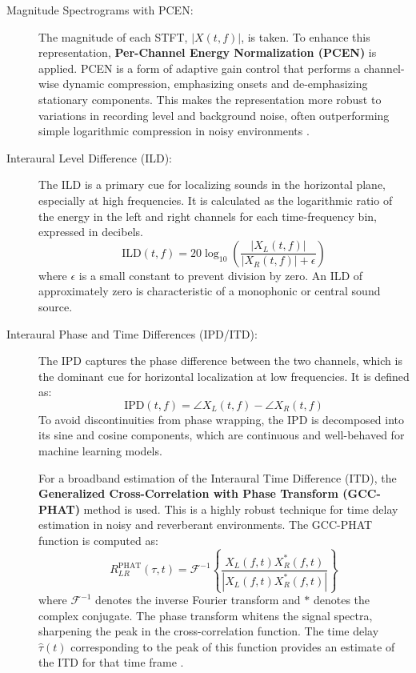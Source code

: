 \documentclass[12pt, a4paper]{article}
\begin{document}
\begin{description}
    \item[Magnitude Spectrograms with PCEN:] The magnitude of each STFT, $|X(t,f)|$, is taken. To enhance this representation, \textbf{Per-Channel Energy Normalization (PCEN)} is applied. PCEN is a form of adaptive gain control that performs a channel-wise dynamic compression, emphasizing onsets and de-emphasizing stationary components. This makes the representation more robust to variations in recording level and background noise, often outperforming simple logarithmic compression in noisy environments \cite{wang2017per}.
    
    \item[Interaural Level Difference (ILD):] The ILD is a primary cue for localizing sounds in the horizontal plane, especially at high frequencies. It is calculated as the logarithmic ratio of the energy in the left and right channels for each time-frequency bin, expressed in decibels.
    \begin{equation}
        \text{ILD}(t, f) = 20 \log_{10} \left( \frac{|X_L(t, f)|}{|X_R(t, f)| + \epsilon} \right)
    \end{equation}
    where $\epsilon$ is a small constant to prevent division by zero. An ILD of approximately zero is characteristic of a monophonic or central sound source.
    
    \item[Interaural Phase and Time Differences (IPD/ITD):] The IPD captures the phase difference between the two channels, which is the dominant cue for horizontal localization at low frequencies. It is defined as:
    \begin{equation}
        \text{IPD}(t, f) = \angle X_L(t, f) - \angle X_R(t, f)
    \end{equation}
    To avoid discontinuities from phase wrapping, the IPD is decomposed into its sine and cosine components, which are continuous and well-behaved for machine learning models.
    
    For a broadband estimation of the Interaural Time Difference (ITD), the \textbf{Generalized Cross-Correlation with Phase Transform (GCC-PHAT)} method is used. This is a highly robust technique for time delay estimation in noisy and reverberant environments. The GCC-PHAT function is computed as:
    \begin{equation}
        R_{LR}^{\text{PHAT}}(\tau, t) = \mathcal{F}^{-1} \left\{ \frac{X_L(f, t) X_R^*(f, t)}{|X_L(f, t) X_R^*(f, t)|} \right\}
    \end{equation}
    where $\mathcal{F}^{-1}$ denotes the inverse Fourier transform and $*$ denotes the complex conjugate. The phase transform whitens the signal spectra, sharpening the peak in the cross-correlation function. The time delay $\hat{\tau}(t)$ corresponding to the peak of this function provides an estimate of the ITD for that time frame \cite{knapp1976generalized}.
    

\end{description}
\end{document}
